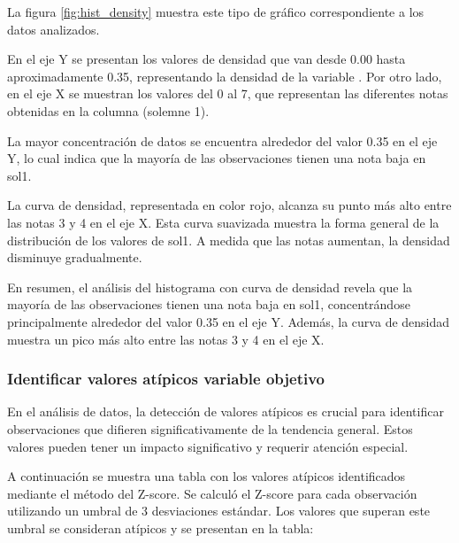 La figura \ref{fig:hist_density} muestra este tipo de gráfico correspondiente a los datos analizados.

En el eje Y se presentan los valores de densidad que van desde 0.00 hasta aproximadamente 0.35, representando la densidad de la variable . Por otro lado, en el eje X se muestran los valores del 0 al 7, que representan las diferentes notas obtenidas en la columna  (solemne 1).

La mayor concentración de datos se encuentra alrededor del valor 0.35 en el eje Y, lo cual indica que la mayoría de las observaciones tienen una nota baja en sol1.

La curva de densidad, representada en color rojo, alcanza su punto más alto entre las notas 3 y 4 en el eje X. Esta curva suavizada muestra la forma general de la distribución de los valores de sol1. A medida que las notas aumentan, la densidad disminuye gradualmente.

En resumen, el análisis del histograma con curva de densidad revela que la mayoría de las observaciones tienen una nota baja en sol1, concentrándose principalmente alrededor del valor 0.35 en el eje Y. Además, la curva de densidad muestra un pico más alto entre las notas 3 y 4 en el eje X.

\subsubsection{Identificar valores atípicos variable objetivo}

En el análisis de datos, la detección de valores atípicos es crucial para identificar observaciones que difieren significativamente de la tendencia general. Estos valores pueden tener un impacto significativo y requerir atención especial.

A continuación se muestra una tabla con los valores atípicos identificados mediante el método del Z-score. Se calculó el Z-score para cada observación utilizando un umbral de 3 desviaciones estándar. Los valores que superan este umbral se consideran atípicos y se presentan en la tabla:

